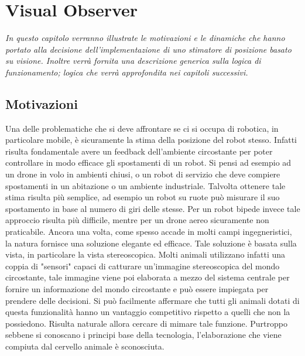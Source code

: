 \chapter{Visual Observer}
\label{chap:visualObs}

\begin{minipage}{12cm}\textit{In questo capitolo verranno illustrate le motivazioni e le dinamiche che hanno portato alla decisione dell'implementazione di uno stimatore di posizione basato su visione. Inoltre verrà fornita una descrizione generica sulla logica di funzionamento; logica che verrà approfondita nei capitoli successivi.}
\end{minipage}

\vspace*{1cm}



\section{Motivazioni}
\label{sec:motivi}

Una delle problematiche che si deve affrontare se ci si occupa di robotica, in particolare mobile, è sicuramente la stima della posizione del robot stesso. Infatti risulta fondamentale avere un feedback dell'ambiente circostante per poter controllare in modo efficace gli spostamenti di un robot. Si pensi ad esempio ad un drone in volo in ambienti chiusi, o un robot di servizio che deve compiere spostamenti in un abitazione o un ambiente industriale. Talvolta ottenere tale stima risulta più semplice, ad esempio un robot su ruote può misurare il suo spostamento in base al numero di giri delle stesse. Per un robot bipede invece tale approccio risulta più difficile, mentre per un drone aereo sicuramente non praticabile. Ancora una volta, come spesso accade in molti campi ingegneristici, la natura fornisce una soluzione elegante ed efficace. Tale soluzione è basata sulla vista, in particolare la vista stereoscopica. Molti animali utilizzano infatti una coppia di "sensori" capaci di catturare un'immagine stereoscopica del mondo circostante, tale immagine viene poi elaborata a mezzo del sistema centrale per fornire un informazione del mondo circostante e può essere impiegata per prendere delle decisioni. Si può facilmente affermare che tutti gli animali dotati di questa funzionalità hanno un vantaggio competitivo rispetto a quelli che non la possiedono.
Risulta naturale allora cercare di mimare tale funzione. Purtroppo sebbene si conoscano i principi base della tecnologia, l'elaborazione che viene compiuta dal cervello animale è sconosciuta.

